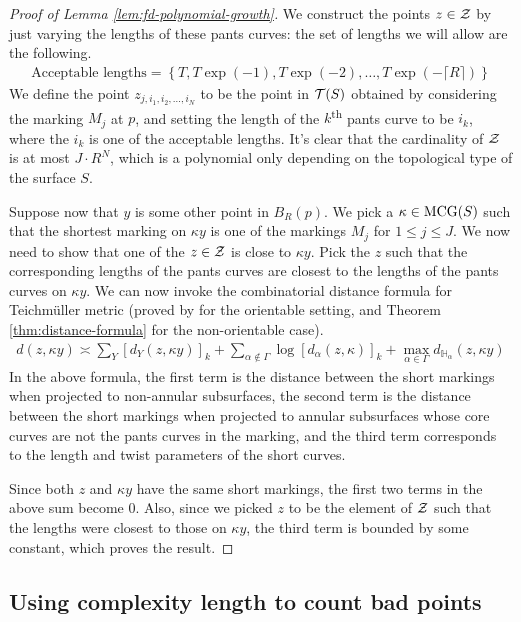 \documentclass[12pt, reqno]{amsart}
\begin{document}
\begin{proof}[Proof of Lemma \ref{lem:fd-polynomial-growth}]
  We construct the points $z \in \mathcal{Z}$ by just varying the lengths of these pants curves: the set of lengths we will allow are the following.
  \begin{align*}
    \text{Acceptable lengths} = \left\{ T, T \exp(-1), T\exp(-2), \ldots, T \exp(-\lceil R \rceil) \right\}
  \end{align*}
  We define the point $z_{j, i_1, i_2, \ldots , i_N}$ to be the point in $\mathcal{T}(S)$ obtained by considering the marking $M_j$ at $p$, and setting the length of the $k$\textsuperscript{th} pants curve to be $i_k$, where the $i_k$ is one of the acceptable lengths.
  It's clear that the cardinality of $\mathcal{Z}$ is at most $J \cdot R^N$, which is a polynomial only depending on the topological type of the surface $S$.

  Suppose now that $y$ is some other point in $B_R(p)$.
  We pick a $\kappa \in \mathrm{MCG}(S)$ such that the shortest marking on $\kappa y$ is one of the markings $M_j$ for $1 \leq j \leq J$.
  We now need to show that one of the $z \in \mathcal{Z}$ is close to $\kappa y$.
  Pick the $z$ such that the corresponding lengths of the pants curves are closest to the lengths of the pants curves on $\kappa y$.
  We can now invoke the combinatorial distance formula for Teichmüller metric (proved by \textcite{rafi2007combinatorial} for the orientable setting, and Theorem \ref{thm:distance-formula} for the non-orientable case).
  \begin{align*}
    d(z, \kappa y) \asymp \sum_Y \left[ d_Y(z, \kappa y) \right]_k + \sum_{\alpha \not \in \Gamma} \log \left[ d_{\alpha} (z, \kappa) \right]_k + \max_{\alpha \in \Gamma} d_{\mathbb{H}_{\alpha}} (z, \kappa y)
  \end{align*}
  In the above formula, the first term is the distance between the short markings when projected to non-annular subsurfaces, the second term is the distance between the short markings when projected to annular subsurfaces whose core curves are not the pants curves in the marking, and the third term corresponds to the length and twist parameters of the short curves.

  Since both $z$ and $\kappa y$ have the same short markings, the first two terms in the above sum become $0$.
  Also, since we picked $z$ to be the element of $\mathcal{Z}$ such that the lengths were closest to those on $\kappa y$, the third term is bounded by some constant, which proves the result.
\end{proof}


\subsection{Using complexity length to count bad points}
\label{sec:using-compl-length}
\end{document}
